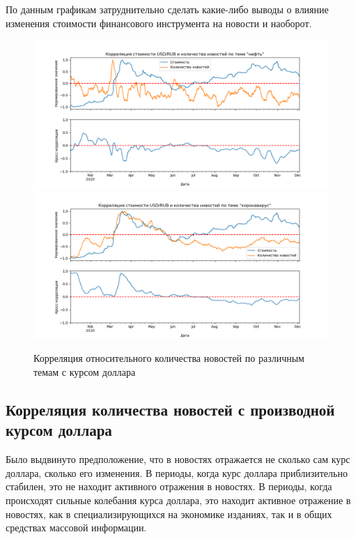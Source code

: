 По данным графикам затруднительно сделать какие-либо выводы о влияние изменения стоимости финансового инструмента на новости и наоборот.

\begin{figure}[h]
    \centering
    \includegraphics[width=\linewidth]{images/correlations/relative/нефть.png}
    \includegraphics[width=\linewidth]{images/correlations/relative/коронавирус.png}
    \caption{Корреляция относительного количества новостей по различным темам с курсом доллара}
    \label{img:correlation-relative}
\end{figure}

\subsection{Корреляция количества новостей с производной курсом доллара}

Было выдвинуто предположение, что в новостях отражается не сколько сам курс доллара, сколько его изменения. В периоды, когда курс доллара приблизительно стабилен, это не находит активного отражения в новостях. В периоды, когда происходят сильные колебания курса доллара, это находит активное отражение в новостях, как в специализирующихся на экономике изданиях, так и в общих средствах массовой информации.

